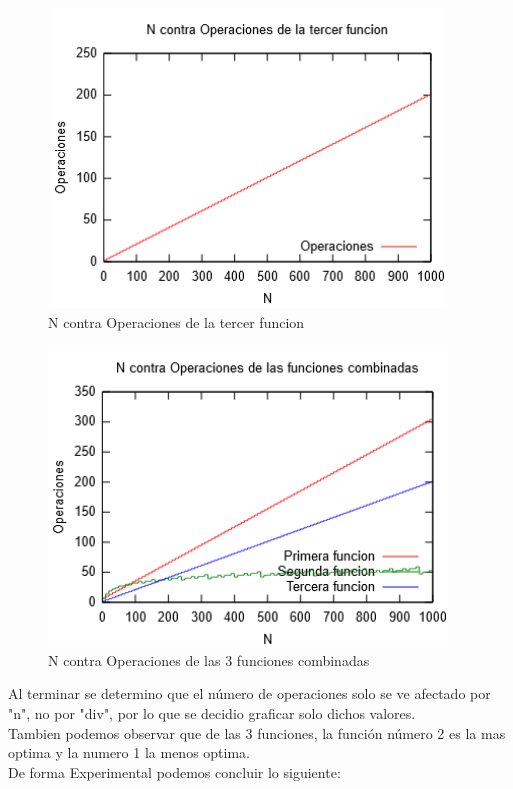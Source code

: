 \documentclass[spanish]{article}
\begin{document}
			\begin{figure}[H]
				\centering
				\includegraphics[width=400px,height=300px]{grafica7}
				\caption{N contra Operaciones de la tercer funcion}
			\end{figure}
			\begin{figure}[H]
				\centering
				\includegraphics[width=400px,height=300px]{grafica8}
				\caption{N contra Operaciones de las 3 funciones combinadas}
			\end{figure}
			Al terminar se determino que el número de operaciones solo se ve afectado por "n", no por "div", por lo que se decidio graficar solo dichos valores.\\
			Tambien podemos observar que de las 3 funciones, la función número 2 es la mas optima y la numero 1 la menos optima.\\
			De forma Experimental podemos concluir lo siguiente:
\end{document}
